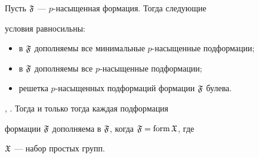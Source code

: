 \begin{cor} Пусть $\frak F$ --- $p$-насыщенная формация. Тогда следующие 


условия равносильны: 


\begin{itemize} 


\item[1)] в $\frak F$ дополняемы все минимальные $p$-насыщенные подформации; 


\item[2)] в $\frak F$ дополняемы все $p$-насыщенные подформации; 


\item[3)] решетка $p$-насыщенных подформаций формации $\frak F$ булева. 


\end{itemize} 


\end{cor} 


 


\begin{cor} \cite{Eid}, \cite{Ved}. Тогда и только тогда каждая подформация 


формации $\frak F$ дополняема в $\frak F$, когда $\frak F=\operatorname{form}\frak X$, где 


$\frak X$ --- набор простых групп. 


\end{cor} 


 


